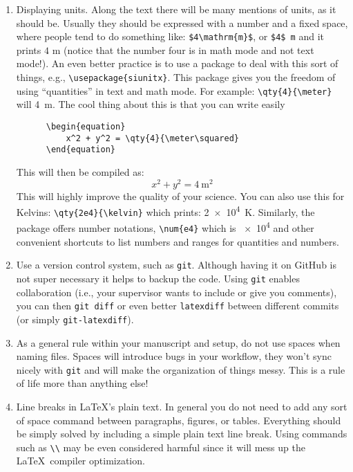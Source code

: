 \begin{enumerate}
  \item Displaying units. Along the text there will be many mentions of units, as it should be. Usually they should be expressed with a number and a fixed space, where people tend to do something like: \verb|$4\mathrm{m}$|, or \verb|$4$ m| and it prints $4$ m (notice that the number four is in math mode and not text mode!). An even better practice is to use a package to deal with this sort of things, e.g., \verb|\usepackage{siunitx}|. This package gives you the freedom of using ``quantities'' in text and math mode. For example: \verb|\qty{4}{\meter}| will \qty{4}{\m}. The cool thing about this is that you can write easily
  \begin{verbatim}
      \begin{equation}
          x^2 + y^2 = \qty{4}{\meter\squared}
      \end{equation}
  \end{verbatim}

  This will then be compiled as:
  \begin{equation}
    x^2 + y^2 = \qty{4}{\meter\squared}
  \end{equation}
  This will highly improve the quality of your science. You can also use this for Kelvins: \verb|\qty{2e4}{\kelvin}| which prints: \qty{2e4}{\kelvin}. Similarly, the package offers number notations, \verb|\num{e4}| which is \num{e4} and other convenient shortcuts to list numbers and ranges for quantities and numbers.

  \item Use a version control system, such as \texttt{git}. Although having it on GitHub is not super necessary it helps to backup the code. Using \texttt{git} enables collaboration (i.e., your supervisor wants to include or give you comments), you can then \texttt{git diff} or even better \texttt{latexdiff} between different commits (or simply \texttt{git-latexdiff}). 

  \item As a general rule within your manuscript and setup, do not use spaces when naming files. Spaces will introduce bugs in your workflow, they won't sync nicely with \texttt{git} and will make the organization of things messy. This is a rule of life more than anything else!
  
  \item Line breaks in \LaTeX's plain text. In general you do not need to add any sort of space command between paragraphs, figures, or tables. Everything should be simply solved by including a simple plain text line break. Using commands such as \verb|\\| may be even considered harmful since it will mess up the \LaTeX\ compiler optimization. 
  

\end{enumerate}
